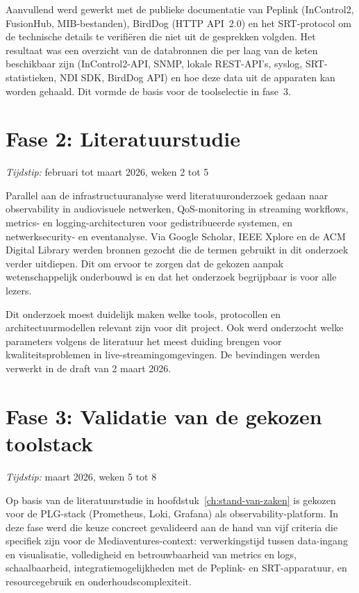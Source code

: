 Aanvullend werd gewerkt met de publieke documentatie van Peplink (InControl2, FusionHub, MIB-bestanden), BirdDog (HTTP API~2.0) en het SRT-protocol om de technische details te verifiëren die niet uit de gesprekken volgden. Het resultaat was een overzicht van de databronnen die per laag van de keten beschikbaar zijn (InControl2-API, SNMP, lokale REST-API's, syslog, SRT-statistieken, NDI SDK, BirdDog API) en hoe deze data uit de apparaten kan worden gehaald. Dit vormde de basis voor de toolselectie in fase~3.

\section{Fase 2: Literatuurstudie}
\label{sec:fase2}

\emph{Tijdstip:} februari tot maart 2026, weken 2 tot 5

Parallel aan de infrastructuuranalyse werd literatuuronderzoek gedaan naar observability in audiovisuele netwerken, QoS-monitoring in streaming workflows, metrics- en logging-architecturen voor gedistribueerde systemen, en netwerksecurity- en eventanalyse. Via Google Scholar, IEEE Xplore en de ACM Digital Library werden bronnen gezocht die de termen gebruikt in dit onderzoek verder uitdiepen. Dit om ervoor te zorgen dat de gekozen aanpak wetenschappelijk onderbouwd is en dat het onderzoek begrijpbaar is voor alle lezers.

Dit onderzoek moest duidelijk maken welke tools, protocollen en architectuurmodellen relevant zijn voor dit project. Ook werd onderzocht welke parameters volgens de literatuur het meest duiding brengen voor kwaliteitsproblemen in live-streamingomgevingen. De bevindingen werden verwerkt in de draft van 2 maart 2026.

\section{Fase 3: Validatie van de gekozen toolstack}
\label{sec:fase3}

\emph{Tijdstip:} maart 2026, weken 5 tot 8

Op basis van de literatuurstudie in hoofdstuk~\ref{ch:stand-van-zaken} is gekozen voor de PLG-stack (Prometheus, Loki, Grafana) als observability-platform. In deze fase werd die keuze concreet gevalideerd aan de hand van vijf criteria die specifiek zijn voor de Mediaventures-context: verwerkingstijd tussen data-ingang en visualisatie, volledigheid en betrouwbaarheid van metrics en logs, schaalbaarheid, integratiemogelijkheden met de Peplink- en SRT-apparatuur, en resourcegebruik en onderhoudscomplexiteit.

